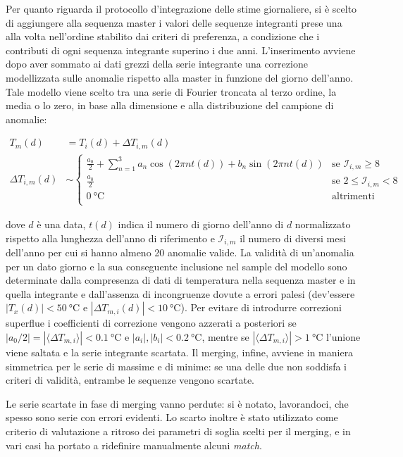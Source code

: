 Per quanto riguarda il protocollo d'integrazione delle stime giornaliere, si è scelto di aggiungere alla sequenza master i valori delle sequenze integranti prese una alla volta nell'ordine stabilito dai criteri di preferenza, a condizione che i contributi di ogni sequenza integrante superino i due anni.
L'inserimento avviene dopo aver sommato ai dati grezzi della serie integrante una correzione modellizzata sulle anomalie rispetto alla master in funzione del giorno dell'anno. Tale modello viene scelto tra una serie di Fourier troncata al terzo ordine, la media o lo zero, in base alla dimensione e alla distribuzione del campione di anomalie:

\begin{align*}
  T_m(d) &= T_i(d) + \Delta T_{i,m}(d) \\
  \Delta T_{i,m}(d) &\sim
  \begin{cases}
    \frac{a_0}{2} + \sum^3_{n=1} a_n \cos( 2\pi n t(d)) + b_n\sin(2\pi n t(d)) & \text{se } \mathcal{I}_{i,m} \ge 8 \\
    \frac{a_0}{2} & \text{se } 2 \le \mathcal{I}_{i,m} < 8 \\
    \qty{0}{\degreeCelsius} & \text{altrimenti} \\
  \end{cases}
\end{align*}

dove \(d\) è una data, \(t(d)\) indica il numero di giorno dell'anno di \(d\) normalizzato rispetto alla lunghezza dell'anno di riferimento e \(\mathcal{I}_{i,m}\) il numero di diversi mesi dell'anno per cui si hanno almeno 20 anomalie valide. La validità di un'anomalia per un dato giorno e la sua conseguente inclusione nel sample del modello sono determinate dalla compresenza di dati di temperatura nella sequenza master e in quella integrante e dall'assenza di incongruenze dovute a errori palesi (dev'essere \(|T_x(d)| < \qty{50}{\degreeCelsius}\) e \(|\Delta T_{m,i}(d)| < \qty{10}{\degreeCelsius}\)). Per evitare di introdurre correzioni superflue i coefficienti di correzione vengono azzerati a posteriori se \(|a_0/2| = |\langle \Delta T_{m,i} \rangle| < \qty{0.1}{\degreeCelsius}\) e \(|a_i|, |b_i| < \qty{0.2}{\degreeCelsius}\), mentre se \(|\langle \Delta T_{m,i} \rangle| > \qty{1}{\degreeCelsius}\) l'unione viene saltata e la serie integrante scartata. Il merging, infine, avviene in maniera simmetrica per le serie di massime e di minime: se una delle due non soddisfa i criteri di validità, entrambe le sequenze vengono scartate.

Le serie scartate in fase di merging vanno perdute: si è notato, lavorandoci, che spesso sono serie con errori evidenti. Lo scarto inoltre è stato utilizzato come criterio di valutazione a ritroso dei parametri di soglia scelti per il merging, e in vari casi ha portato a ridefinire manualmente alcuni \emph{match}.

